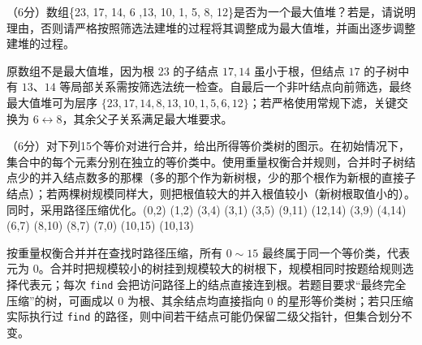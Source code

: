 \begin{question}
（6分）数组\{23, 17, 14, 6 ,13, 10, 1, 5, 8, 12\}是否为一个最大值堆？若是，请说明理由，否则请严格按照筛选法建堆的过程将其调整成为最大值堆，并画出逐步调整建堆的过程。
\begin{solution}
原数组不是最大值堆，因为根 $23$ 的子结点 $17,14$ 虽小于根，但结点 $17$ 的子树中有 $13$、$14$ 等局部关系需按筛选法统一检查。自最后一个非叶结点向前筛选，最终最大值堆可为层序 $\{23,17,14,8,13,10,1,5,6,12\}$；若严格使用常规下滤，关键交换为 $6\leftrightarrow8$，其余父子关系满足最大堆要求。
\end{solution}
\end{question}

\begin{question}
（6分）对下列15个等价对进行合并，给出所得等价类树的图示。在初始情况下，集合中的每个元素分别在独立的等价类中。使用重量权衡合并规则，合并时子树结点少的并入结点数多的那棵（多的那个作为新树根，少的那个根作为新根的直接子结点）；若两棵树规模同样大，则把根值较大的并入根值较小（新树根取值小的）。同时，采用路径压缩优化。(0,2) (1,2) (3,4) (3,1) (3,5) (9,11) (12,14) (3,9) (4,14) (6,7) (8,10) (8,7) (7,0) (10,15) (10,13)
\begin{solution}
按重量权衡合并并在查找时路径压缩，所有 $0\sim15$ 最终属于同一个等价类，代表元为 $0$。合并时把规模较小的树挂到规模较大的树根下，规模相同时按题给规则选择代表元；每次 \texttt{find} 会把访问路径上的结点直接连到根。若题目要求“最终完全压缩”的树，可画成以 $0$ 为根、其余结点均直接指向 $0$ 的星形等价类树；若只压缩实际执行过 \texttt{find} 的路径，则中间若干结点可能仍保留二级父指针，但集合划分不变。
\end{solution}
\end{question}


